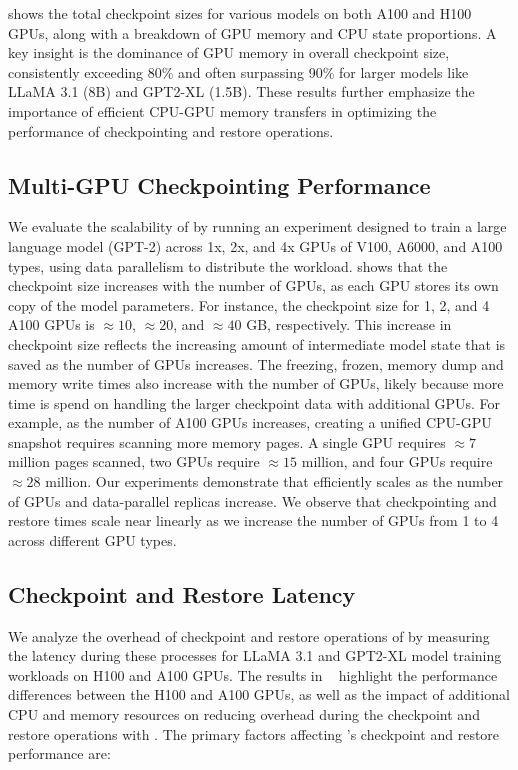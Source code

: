   shows the total \sys checkpoint sizes for various models on both A100 and H100 GPUs, along with a breakdown of GPU memory and CPU state proportions. A key insight is the dominance of GPU memory in overall checkpoint size, consistently exceeding 80\% and often surpassing 90\% for larger models like LLaMA 3.1 (8B) and GPT2-XL (1.5B). These results further emphasize the importance of efficient CPU-GPU memory transfers in optimizing the performance of checkpointing and restore operations.

\subsection{Multi-GPU Checkpointing Performance}
\label{sec:eval:scalability}
%
We evaluate the scalability of \sys by running an experiment designed to train a large language model (GPT-2) across 1x, 2x, and 4x GPUs of V100, A6000, and A100 types, using data parallelism to distribute the workload.
 shows that the checkpoint size increases with the number of GPUs, as each GPU stores its own copy of the model parameters.
For instance, the checkpoint size for 1, 2, and 4 A100 GPUs is $\approx10$, $\approx20$, and $\approx40$ GB, respectively.
This increase in checkpoint size reflects the increasing amount of intermediate model state that is saved as the number of GPUs increases.
The freezing, frozen, memory dump and memory write times also increase with the number of GPUs, likely because more time is spend on handling the larger checkpoint data with additional GPUs.
For example, as the number of A100 GPUs increases, creating a unified CPU-GPU snapshot requires scanning more memory pages.
A single GPU requires $\approx7$ million pages scanned, two GPUs require $\approx15$ million, and four GPUs require $\approx28$ million. Our experiments demonstrate that \sys efficiently scales as the number of GPUs and data-parallel replicas increase. We observe that checkpointing and restore times scale near linearly as we increase the number of GPUs from 1 to 4 across different GPU types.

\subsection{Checkpoint and Restore Latency}%
\label{sec:eval:overhead}%
We analyze the overhead of checkpoint and restore operations of \sys by measuring the latency during these processes for LLaMA 3.1 and GPT2-XL model training workloads on H100 and A100 GPUs. The results in ~ highlight the performance differences between the H100 and A100 GPUs, as well as the impact of additional CPU and memory resources on reducing overhead during the checkpoint and restore operations with \sys. The primary factors affecting \sys's checkpoint and restore performance are:

